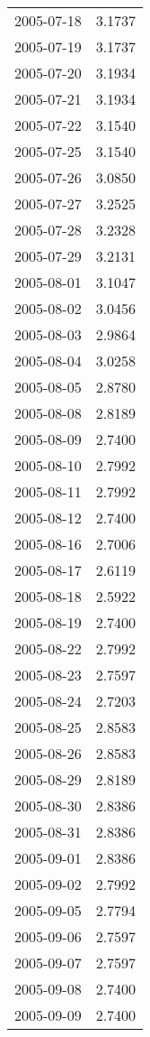 \begin{tabular}{lr}
2005-07-18 &      3.1737 \\
2005-07-19 &      3.1737 \\
2005-07-20 &      3.1934 \\
2005-07-21 &      3.1934 \\
2005-07-22 &      3.1540 \\
2005-07-25 &      3.1540 \\
2005-07-26 &      3.0850 \\
2005-07-27 &      3.2525 \\
2005-07-28 &      3.2328 \\
2005-07-29 &      3.2131 \\
2005-08-01 &      3.1047 \\
2005-08-02 &      3.0456 \\
2005-08-03 &      2.9864 \\
2005-08-04 &      3.0258 \\
2005-08-05 &      2.8780 \\
2005-08-08 &      2.8189 \\
2005-08-09 &      2.7400 \\
2005-08-10 &      2.7992 \\
2005-08-11 &      2.7992 \\
2005-08-12 &      2.7400 \\
2005-08-16 &      2.7006 \\
2005-08-17 &      2.6119 \\
2005-08-18 &      2.5922 \\
2005-08-19 &      2.7400 \\
2005-08-22 &      2.7992 \\
2005-08-23 &      2.7597 \\
2005-08-24 &      2.7203 \\
2005-08-25 &      2.8583 \\
2005-08-26 &      2.8583 \\
2005-08-29 &      2.8189 \\
2005-08-30 &      2.8386 \\
2005-08-31 &      2.8386 \\
2005-09-01 &      2.8386 \\
2005-09-02 &      2.7992 \\
2005-09-05 &      2.7794 \\
2005-09-06 &      2.7597 \\
2005-09-07 &      2.7597 \\
2005-09-08 &      2.7400 \\
2005-09-09 &      2.7400 \\

\end{tabular}
